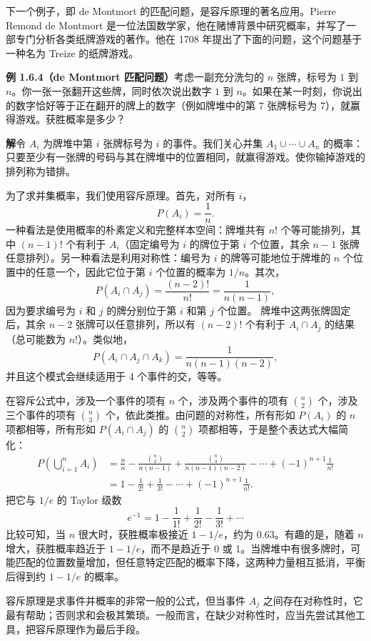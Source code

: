 \documentclass[UTF8, 12pt, fontset=fandol, oneside]{ctexart}
\begin{document}
下一个例子，即 de Montmort 的匹配问题，是容斥原理的著名应用。Pierre Remond de Montmort 是一位法国数学家，他在赌博背景中研究概率，并写了一部专门分析各类纸牌游戏的著作。他在 1708 年提出了下面的问题，这个问题基于一种名为 Treize 的纸牌游戏。

\noindent\textbf{例 1.6.4（de Montmort 匹配问题）}\quad 考虑一副充分洗匀的 $n$ 张牌，标号为 $1$ 到 $n$。你一张一张翻开这些牌，同时依次说出数字 $1$ 到 $n$。如果在某一时刻，你说出的数字恰好等于正在翻开的牌上的数字（例如牌堆中的第 7 张牌标号为 7），就赢得游戏。获胜概率是多少？

\noindent\textbf{解}\quad 令 $A_i$ 为牌堆中第 $i$ 张牌标号为 $i$ 的事件。我们关心并集 $A_1\cup\cdots\cup A_n$ 的概率：只要至少有一张牌的号码与其在牌堆中的位置相同，就赢得游戏。使你输掉游戏的排列称为错排。

为了求并集概率，我们使用容斥原理。首先，对所有 $i$，
\[
  P(A_i)=\frac1n.
\]
一种看法是使用概率的朴素定义和完整样本空间：牌堆共有 $n!$ 个等可能排列，其中 $(n-1)!$ 个有利于 $A_i$（固定编号为 $i$ 的牌位于第 $i$ 个位置，其余 $n-1$ 张牌任意排列）。另一种看法是利用对称性：编号为 $i$ 的牌等可能地位于牌堆的 $n$ 个位置中的任意一个，因此它位于第 $i$ 个位置的概率为 $1/n$。其次，
\[
  P(A_i\cap A_j)=\frac{(n-2)!}{n!}=\frac{1}{n(n-1)},
\]
因为要求编号为 $i$ 和 $j$ 的牌分别位于第 $i$ 和第 $j$ 个位置。
牌堆中这两张牌固定后，其余 $n-2$ 张牌可以任意排列，所以有 $(n-2)!$ 个有利于 $A_i\cap A_j$ 的结果（总可能数为 $n!$）。类似地，
\[
  P(A_i\cap A_j\cap A_k)=\frac{1}{n(n-1)(n-2)},
\]
并且这个模式会继续适用于 4 个事件的交，等等。

在容斥公式中，涉及一个事件的项有 $n$ 个，涉及两个事件的项有 $\binom n2$ 个，涉及三个事件的项有 $\binom n3$ 个，依此类推。由问题的对称性，所有形如 $P(A_i)$ 的 $n$ 项都相等，所有形如 $P(A_i\cap A_j)$ 的 $\binom n2$ 项都相等，于是整个表达式大幅简化：
\[
\begin{aligned}
  P\left(\bigcup_{i=1}^{n}A_i\right)
  &=\frac nn-\frac{\binom n2}{n(n-1)}
    +\frac{\binom n3}{n(n-1)(n-2)}
    -\cdots+(-1)^{n+1}\frac1{n!}\\
  &=1-\frac1{2!}+\frac1{3!}-\cdots+(-1)^{n+1}\frac1{n!}.
\end{aligned}
\]
把它与 $1/e$ 的 Taylor 级数
\[
  e^{-1}=1-\frac1{1!}+\frac1{2!}-\frac1{3!}+\cdots
\]
比较可知，当 $n$ 很大时，获胜概率极接近 $1-1/e$，约为 $0.63$。有趣的是，随着 $n$ 增大，获胜概率趋近于 $1-1/e$，而不是趋近于 0 或 1。当牌堆中有很多牌时，可能匹配的位置数量增加，但任意特定匹配的概率下降，这两种力量相互抵消，平衡后得到约 $1-1/e$ 的概率。

容斥原理是求事件并概率的非常一般的公式，但当事件 $A_j$ 之间存在对称性时，它最有帮助；否则求和会极其繁琐。一般而言，在缺少对称性时，应当先尝试其他工具，把容斥原理作为最后手段。
\end{document}
